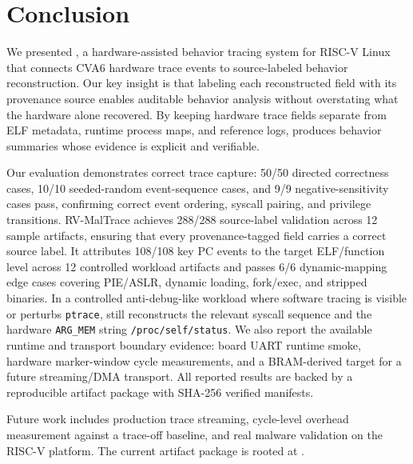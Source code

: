 \section{Conclusion}
\label{sec:conclusion}

We presented \rvmt, a hardware-assisted behavior tracing system for RISC-V Linux that connects CVA6 hardware trace events to source-labeled behavior reconstruction. Our key insight is that labeling each reconstructed field with its provenance source enables auditable behavior analysis without overstating what the hardware alone recovered. By keeping hardware trace fields separate from ELF metadata, runtime process maps, and reference logs, \rvmt produces behavior summaries whose evidence is explicit and verifiable.

Our evaluation demonstrates correct trace capture: 50/50 directed correctness
cases, 10/10 seeded-random event-sequence cases, and 9/9 negative-sensitivity
cases pass, confirming correct event ordering, syscall pairing, and privilege
transitions. RV-MalTrace achieves 288/288 source-label validation across 12
sample artifacts, ensuring that every provenance-tagged field carries a correct
source label. It attributes 108/108 key PC events to the target ELF/function
level across 12 controlled workload artifacts and passes 6/6 dynamic-mapping edge
cases covering PIE/ASLR, dynamic loading, fork/exec, and stripped binaries. In a
controlled anti-debug-like workload where software tracing is visible or perturbs
\texttt{ptrace}, \rvmt still reconstructs the relevant syscall sequence and the
hardware \texttt{ARG\_MEM} string \texttt{/proc/self/status}. We also report the
available runtime and transport boundary evidence: board UART runtime smoke,
hardware marker-window cycle measurements, and a BRAM-derived target for a
future streaming/DMA transport. All reported results are backed by a reproducible
artifact package with SHA-256 verified manifests.

Future work includes production trace streaming, cycle-level overhead
measurement against a trace-off baseline, and real malware validation on the
RISC-V platform. The current artifact package is rooted at \artifactroot.
